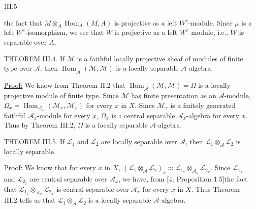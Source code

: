 
III.5

the fact that $M\otimes_A\operatorname{Hom}_A(M,A)$ is projective as a left $W^e$-module.
Since $\mu$ is a left $W^e$-isomorphism, we see that $W$ is projective as a
left $W^e$ module, i.e., $W$ is separable over $A$.

THEOREM III.4. If $\mathcal M$ is a faithful locally projective sheaf of
modules of finite type over $\mathcal A$, then $\underline{\operatorname{Hom}}_{\mathcal A}(\mathcal M,\mathcal M)$ is a locally separable
$\mathcal A$-algebra.

\uline{Proof:} We know from Theorem II.2 that $\underline{\operatorname{Hom}}_{\mathcal A}(\mathcal M,\mathcal M)=\Omega$
is a locally projective module of finite type. Since $\mathcal M$ has finite
presentation as an $\mathcal A$-module, $\Omega_x=\operatorname{Hom}_{\mathcal A_x}(\mathcal M_x,\mathcal M_x)$ for every $x$ in
$X$. Since $\mathcal M_x$ is a finitely generated faithful $\mathcal A_x$-module for every $x$,
$\Omega_x$ is a central separable $\mathcal A_x$-algebra for every $x$. Thus by
Theorem III.2, $\Omega$ is a locally separable $\mathcal A$-algebra.

THEOREM III.5. If $\mathcal L_1$ and $\mathcal L_2$ are locally separable over $\mathcal A$,
then $\mathcal L_1\otimes_{\mathcal A}\mathcal L_2$ is locally separable.

\uline{Proof:} We know that for every $x$ in $X$, $(\mathcal L_1\otimes_{\mathcal A}\mathcal L_2)_x\approx\mathcal L_{1_x}\otimes_{\mathcal A_x}\mathcal L_{2_x}$.
Since $\mathcal L_{1_x}$ and $\mathcal L_{2_x}$ are central separable over $\mathcal A_x$, we have, from
[4, Proposition 1.5]the fact that $\mathcal L_{1_x}\otimes_{\mathcal A_x}\mathcal L_{2_x}$ is central separable over
$\mathcal A_x$ for every $x$ in $X$. Thus Theorem III.2 tells us that $\mathcal L_1\otimes_{\mathcal A}\mathcal L_2$ is a
locally separable $\mathcal A$-algebra.
